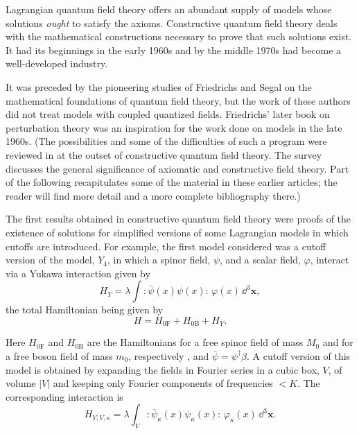Lagrangian quantum field theory offers an abundant supply of models whose
solutions \emph{ought} to satisfy the axioms. Constructive quantum field
theory deals with the mathematical constructions necessary to prove that such
solutions exist. It had its beginnings in the early 1960s and by the middle
1970s had become a well-developed industry.

It was preceded by the pioneering studies of Friedrichs \cite{pct-app-3} and Segal \cite{pct-app-4} on
the mathematical foundations of quantum field theory, but the work of these
authors did not treat models with coupled quantized fields. Friedrichs' later
book on perturbation theory \cite{pct-app-5} was an inspiration for the work done on models
in the late 1960s. (The possibilities and some of the difficulties of such a
program were reviewed in \cite{pct-app-6} at the outset of constructive quantum field
theory. The survey \cite{pct-app-7} discusses the general significance of axiomatic and
constructive field theory. Part of the following recapitulates some of the
material in these earlier articles; the reader will find more detail and a
more complete bibliography there.)

The first results obtained in constructive quantum field theory were proofs of
the existence of solutions for simplified versions of some Lagrangian models
in which cutoffs are introduced. For example, the first model considered was a
cutoff version of the model, $Y_4$, in which a spinor field, $\psi$, and a
scalar field, $\varphi$, interact via a Yukawa interaction given by
\[
  H_Y = \lambda \int :\bar\psi(x)\psi(x):\,\varphi(x)\,\dd^3\mathbf{x},
\]
the total Hamiltonian being given by
\[
  H = H_{0\mathrm F}+H_{0\mathrm B}+H_Y.
\]

Here $H_{0\mathrm F}$ and $H_{0\mathrm B}$ are the Hamiltonians for a free
spinor field of mass $M_0$ and for a free boson field of mass $m_0$,
respectively \cite{pct-app-8,pct-app-9}, and $\bar\psi=\psi^\dagger\beta$. A cutoff version
of this model is obtained by expanding the fields in Fourier series in a
cubic box, $V$, of volume $|V|$ and keeping only Fourier components of
frequencies $<K$. The corresponding interaction is
\[
  H_{Y;V,\kappa}
  = \lambda\int_V :\bar\psi_\kappa(x)\psi_\kappa(x):\,
      \varphi_\kappa(x)\,\dd^3\mathbf{x}.
\]

